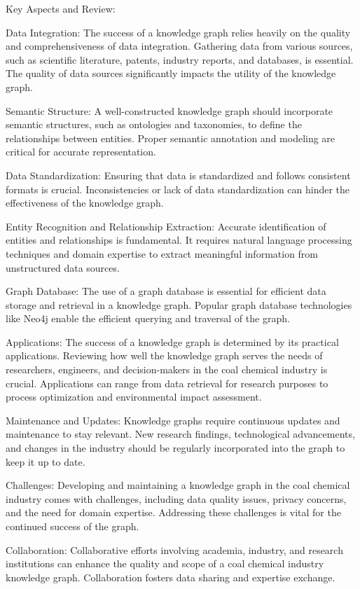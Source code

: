 Key Aspects and Review:

Data Integration: The success of a knowledge graph relies heavily on the quality and comprehensiveness of data integration. Gathering data from various sources, such as scientific literature, patents, industry reports, and databases, is essential. The quality of data sources significantly impacts the utility of the knowledge graph.

Semantic Structure: A well-constructed knowledge graph should incorporate semantic structures, such as ontologies and taxonomies, to define the relationships between entities. Proper semantic annotation and modeling are critical for accurate representation.

Data Standardization: Ensuring that data is standardized and follows consistent formats is crucial. Inconsistencies or lack of data standardization can hinder the effectiveness of the knowledge graph.

Entity Recognition and Relationship Extraction: Accurate identification of entities and relationships is fundamental. It requires natural language processing techniques and domain expertise to extract meaningful information from unstructured data sources.

Graph Database: The use of a graph database is essential for efficient data storage and retrieval in a knowledge graph. Popular graph database technologies like Neo4j enable the efficient querying and traversal of the graph.

Applications: The success of a knowledge graph is determined by its practical applications. Reviewing how well the knowledge graph serves the needs of researchers, engineers, and decision-makers in the coal chemical industry is crucial. Applications can range from data retrieval for research purposes to process optimization and environmental impact assessment.

Maintenance and Updates: Knowledge graphs require continuous updates and maintenance to stay relevant. New research findings, technological advancements, and changes in the industry should be regularly incorporated into the graph to keep it up to date.

Challenges: Developing and maintaining a knowledge graph in the coal chemical industry comes with challenges, including data quality issues, privacy concerns, and the need for domain expertise. Addressing these challenges is vital for the continued success of the graph.

Collaboration: Collaborative efforts involving academia, industry, and research institutions can enhance the quality and scope of a coal chemical industry knowledge graph. Collaboration fosters data sharing and expertise exchange.

